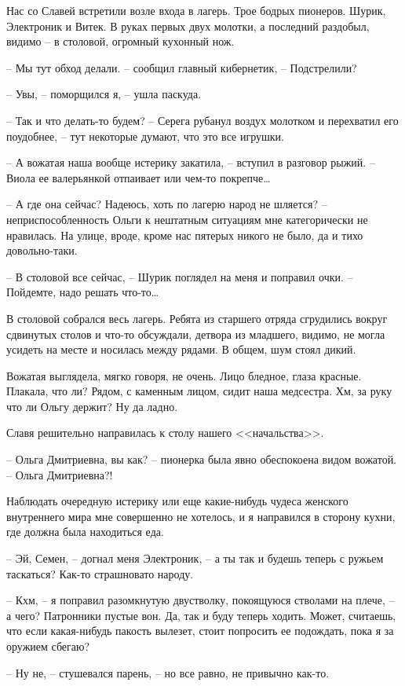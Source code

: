 \documentclass[a4paper]{book}
\begin{document}
Нас со Славей встретили возле входа в лагерь. Трое бодрых пионеров. Шурик, Электроник и Витек. В руках первых двух молотки, а последний раздобыл, видимо -- в столовой, огромный кухонный нож. 

-- Мы тут обход делали. -- сообщил главный кибернетик, -- Подстрелили?

-- Увы, -- поморщился я, -- ушла паскуда.

-- Так и что делать-то будем? -- Серега рубанул воздух молотком и перехватил его поудобнее, -- тут некоторые думают, что это все игрушки. 

-- А вожатая наша вообще истерику закатила, -- вступил в разговор рыжий. -- Виола ее валерьянкой отпаивает или чем-то покрепче\ldots

-- А где она сейчас? Надеюсь, хоть по лагерю народ не шляется? -- неприспособленность Ольги к нештатным ситуациям мне категорически не нравилась. На улице, вроде, кроме нас пятерых никого не было, да и тихо довольно-таки. 

-- В столовой все сейчас, -- Шурик поглядел на меня и поправил очки. -- Пойдемте, надо решать что-то\ldots

В столовой собрался весь лагерь. Ребята из старшего отряда сгрудились вокруг сдвинутых столов и что-то обсуждали, детвора из младшего, видимо, не могла усидеть на месте и носилась между рядами. В общем, шум стоял дикий.

Вожатая выглядела, мягко говоря, не очень. Лицо бледное, глаза красные. Плакала, что ли? Рядом, с каменным лицом, сидит наша медсестра. Хм, за руку что ли Ольгу держит? Ну да ладно.

Славя решительно направилась к столу нашего <<начальства>>. 

-- Ольга Дмитриевна, вы как? -- пионерка была явно обеспокоена видом вожатой. -- Ольга Дмитриевна?!

Наблюдать очередную истерику или еще какие-нибудь чудеса женского внутреннего мира мне совершенно не хотелось, и я направился в сторону кухни, где должна была находиться еда.

-- Эй, Семен, -- догнал меня Электроник, -- а ты так и будешь теперь с ружьем таскаться? Как-то страшновато народу.

-- Кхм, -- я поправил разомкнутую двустволку, покоящуюся стволами на плече, -- а чего? Патронники пустые вон. Да, так и буду теперь ходить. Может, считаешь, что если какая-нибудь пакость вылезет, стоит попросить ее подождать, пока я за оружием сбегаю?

-- Ну не, -- стушевался парень, -- но все равно, не привычно как-то. 
\end{document}
